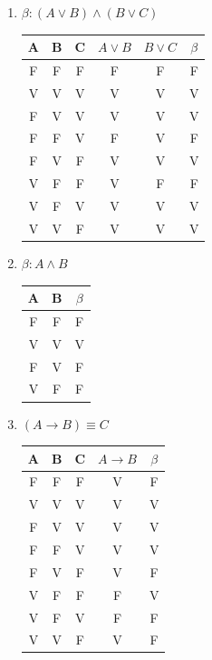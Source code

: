 \documentclass[a4paper,10pt]{article}
\begin{document}
\begin {enumerate}
 \item $\beta : (A \vee B) \wedge(B \vee C)$
 \begin{center}

 \begin{tabular}{|c|c|c|c|c||c|}
	\hline
	A & B & C & $A \vee B$ & $B \vee C$& $\beta$ \\
	\hline 
	F & F & F & F & F & F \\
	\hline
	V & V & V & V & V & V \\
	\hline
	F & V & V & V & V & V \\
	\hline
	F & F & V & F & V & F \\
	\hline
	F & V & F & V & V & V \\
	\hline
	V & F & F & V & F & F \\
	\hline
	V & F & V & V & V & V \\
	\hline
	V & V & F & V & V & V \\
 	\hline
 \end{tabular}
  
 \end{center}
 \item $\beta : A \wedge B$\\
 
 \begin{center}

 \begin{tabular}{|c|c||c|}
	\hline
	A & B & $\beta$ \\
	\hline 
	F & F & F  \\
	\hline
	V & V & V  \\
	\hline
	F & V & F \\
	\hline
	V & F & F \\
	\hline
 \end{tabular}
  
 \end{center}
 
 
\item $(A \rightarrow B) \equiv C $


 \begin{center}

 \begin{tabular}{|c|c|c|c||c|}
	\hline
	A & B & C & $A \rightarrow B$ & $\beta$ \\
	\hline 
	F & F & F & V & F \\
	\hline
	V & V & V & V & V \\
	\hline
	F & V & V & V & V \\
	\hline
	F & F & V & V & V  \\
	\hline
	F & V & F & V & F \\
	\hline
	V & F & F & F & V \\
	\hline
	V & F & V & F & F \\
	\hline
	V & V & F & V & F \\
 	\hline
 \end{tabular}
  
 \end{center}
\end {enumerate}
\end{document}
